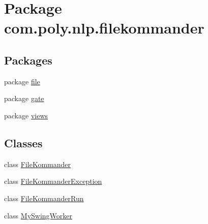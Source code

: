 \hypertarget{namespacecom_1_1poly_1_1nlp_1_1filekommander}{\section{Package com.\-poly.\-nlp.\-filekommander}
\label{namespacecom_1_1poly_1_1nlp_1_1filekommander}
}
\subsection*{Packages}
\begin{DoxyCompactItemize}
\item 
package \hyperlink{namespacecom_1_1poly_1_1nlp_1_1filekommander_1_1file}{file}
\item 
package \hyperlink{namespacecom_1_1poly_1_1nlp_1_1filekommander_1_1gate}{gate}
\item 
package \hyperlink{namespacecom_1_1poly_1_1nlp_1_1filekommander_1_1views}{views}
\end{DoxyCompactItemize}
\subsection*{Classes}
\begin{DoxyCompactItemize}
\item 
class \hyperlink{classcom_1_1poly_1_1nlp_1_1filekommander_1_1_file_kommander}{File\-Kommander}
\item 
class \hyperlink{classcom_1_1poly_1_1nlp_1_1filekommander_1_1_file_kommander_exception}{File\-Kommander\-Exception}
\item 
class \hyperlink{classcom_1_1poly_1_1nlp_1_1filekommander_1_1_file_kommander_run}{File\-Kommander\-Run}
\item 
class \hyperlink{classcom_1_1poly_1_1nlp_1_1filekommander_1_1_my_swing_worker}{My\-Swing\-Worker}
\end{DoxyCompactItemize}
